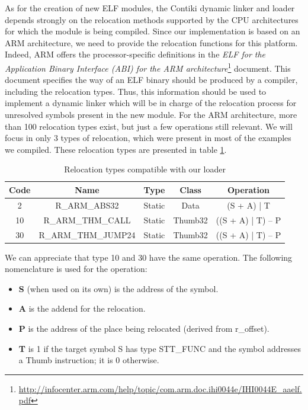As for the creation of new ELF modules, the Contiki dynamic linker and loader\cite{dunkels06runtime} depends strongly on the relocation methods supported by the CPU architectures for which the module is being compiled.
Since our implementation is based on an ARM architecture, we need to provide the relocation functions for this platform.
Indeed, ARM offers the processor-specific definitions in the \textit{ELF for the Application Binary Interface (ABI) for the ARM architecture}\footnote{\url{http://infocenter.arm.com/help/topic/com.arm.doc.ihi0044e/IHI0044E_aaelf.pdf}} document.
This document specifies the way of an ELF binary should be produced by a compiler, including the relocation types.
Thus, this information should be used to implement a dynamic linker which will be in charge of the relocation process for unresolved symbols present in the new module.
For the ARM architecture, more than 100 relocation types exist, but just a few operations still relevant.
We will focus in only 3 types of relocation, which were present in most of the examples we compiled.
These relocation types are presented in table \ref{tab:relocTypes}.

\begin{table}[htb]
	\centering
	\caption{Relocation types compatible with our loader}
	\label{tab:relocTypes}
	\begin{tabular}{|c|c|c|c|c|}
		\hline
		\textbf{Code} & \textbf{Name}       & \textbf{Type} & \textbf{Class} & \textbf{Operation} \\ \hline
		2             & R\_ARM\_ABS32       & Static        & Data           & (S + A) | T        \\ \hline
		10            & R\_ARM\_THM\_CALL   & Static        & Thumb32        & ((S + A) | T) – P  \\ \hline
		30            & R\_ARM\_THM\_JUMP24 & Static        & Thumb32        & ((S + A) | T) – P  \\ \hline
	\end{tabular}
\end{table}

We can appreciate that type 10 and 30 have the same operation.
The following nomenclature is used for the operation:
\begin{itemize}
	\item \textbf{S} (when used on its own) is the address of the symbol.
	\item \textbf{A} is the addend for the relocation.
	\item \textbf{P} is the address of the place being relocated (derived from r\_offset).
	\item \textbf{T} is 1 if the target symbol S has type STT\_FUNC and the symbol addresses a Thumb instruction; it is 0 otherwise.
\end{itemize}

